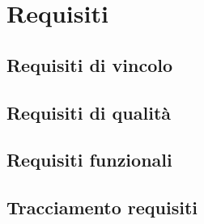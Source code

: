 \section{Requisiti}
\subsection{Requisiti di vincolo}
\subsection{Requisiti di qualità}
\subsection{Requisiti funzionali}
\subsection{Tracciamento requisiti}